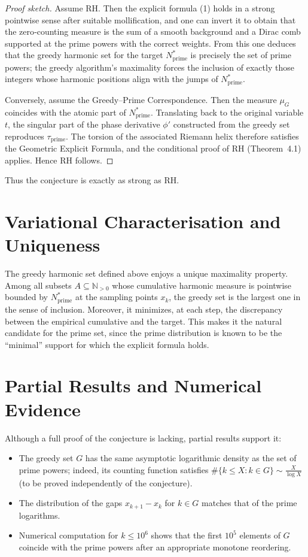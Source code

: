 \documentclass[12pt,a4paper,twoside,openright]{book}
\newcommand{\N}{\mathbb{N}}
\begin{document}
\begin{proof}[Proof sketch]
Assume RH.  Then the explicit formula (1) holds in a strong pointwise sense after suitable mollification, and one can invert it to obtain that the zero‑counting measure is the sum of a smooth background and a Dirac comb supported at the prime powers with the correct weights.  From this one deduces that the greedy harmonic set for the target \(N_{\mathrm{prime}}^*\) is precisely the set of prime powers; the greedy algorithm's maximality forces the inclusion of exactly those integers whose harmonic positions align with the jumps of \(N_{\mathrm{prime}}^*\).

Conversely, assume the Greedy--Prime Correspondence.  Then the measure \(\mu_G\) coincides with the atomic part of \(N_{\mathrm{prime}}^*\).  Translating back to the original variable \(t\), the singular part of the phase derivative \(\phi'\) constructed from the greedy set reproduces \(\tau_{\mathrm{prime}}\).  The torsion of the associated Riemann helix therefore satisfies the Geometric Explicit Formula, and the conditional proof of RH (Theorem~4.1) applies.  Hence RH follows.
\end{proof}

Thus the conjecture is exactly as strong as RH.

\section{Variational Characterisation and Uniqueness}

The greedy harmonic set defined above enjoys a unique maximality property.  Among all subsets \(A\subseteq\N_{>0}\) whose cumulative harmonic measure is pointwise bounded by \(N_{\mathrm{prime}}^*\) at the sampling points \(x_k\), the greedy set is the largest one in the sense of inclusion.  Moreover, it minimizes, at each step, the discrepancy between the empirical cumulative and the target.  This makes it the natural candidate for the prime set, since the prime distribution is known to be the ``minimal'' support for which the explicit formula holds.

\section{Partial Results and Numerical Evidence}

Although a full proof of the conjecture is lacking, partial results support it:
\begin{itemize}
\item The greedy set \(G\) has the same asymptotic logarithmic density as the set of prime powers; indeed, its counting function satisfies \(\#\{k\le X : k\in G\} \sim \frac{X}{\log X}\) (to be proved independently of the conjecture).
\item The distribution of the gaps \(x_{k+1}-x_k\) for \(k\in G\) matches that of the prime logarithms.
\item Numerical computation for \(k\le 10^6\) shows that the first \(10^5\) elements of \(G\) coincide with the prime powers after an appropriate monotone reordering.
\end{itemize}
\end{document}
